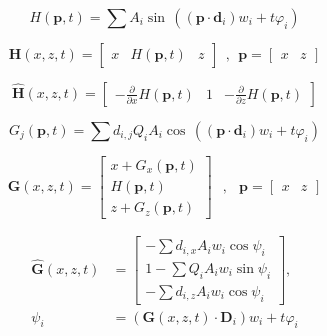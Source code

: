 \begin{equation} \label{eq:sum_of_sine_waves}
    H(\mathbf{p},t) = \sum{
        A_i \sin \, (
            (\mathbf{p} \cdot \mathbf{d}_i) w_i
            + t \varphi_i
        )
    }
\end{equation}

\begin{equation} \label{eq:sum_of_sine_waves_position}
    \mathbf{H}(x,z,t) = \begin{bmatrix}
        x&
        H(\mathbf{p},t)&
        z
    \end{bmatrix}\;\,,\;\,
    \mathbf{p} = \begin{bmatrix}
        x&z
    \end{bmatrix}
\end{equation}

\begin{equation} \label{eq:sum_of_sine_waves_normal}
    \mathbf{\hat{H}}(x,z,t) = \begin{bmatrix}
        -\frac{\partial}{\partial x} H(\mathbf{p},t)&
        1&
        -\frac{\partial}{\partial z} H(\mathbf{p},t)
    \end{bmatrix}
\end{equation}

\begin{equation} \label{eq:gerstner_wave}
    G_j(\mathbf{p},t) = \sum{
        d_{i,j} Q_iA_i \cos \, (
            (\mathbf{p} \cdot \mathbf{d}_i) w_i
            + t \varphi_i
        )
    }
\end{equation}

\begin{equation} \label{eq:gerstner_wave_position}
    \mathbf{G}(x,z,t) = \begin{bmatrix}
        x + G_x(\mathbf{p},t)\\
        H(\mathbf{p},t)\\
        z + G_z(\mathbf{p},t)
    \end{bmatrix}\;\;\,,\;\;\,
    \mathbf{p} = \begin{bmatrix}
        x&z
    \end{bmatrix}
\end{equation}

\begin{equation} \label{eq:gerstner_wave_normal}
    \begin{split}
    \mathbf{\hat{G}}(x,z,t) &= \begin{bmatrix}
        -\sum{d_{i,x} A_iw_i \cos \psi_i}\\
        1 - \sum{Q_iA_iw_i \sin \psi_i}\\
        -\sum{d_{i,z} A_iw_i \cos \psi_i}
    \end{bmatrix},\\
        \psi_i &= (\mathbf{G}(x,z,t) \cdot \mathbf{D}_i)w_i + t \varphi_i
    \end{split}
\end{equation}
